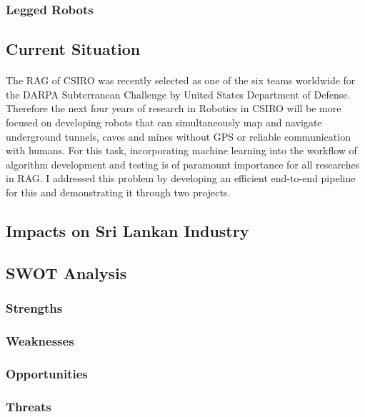 \subsubsection*{Legged Robots}
\subsubsection*{}

\subsection{Current Situation}

\paragraph{}
The RAG of CSIRO was recently selected as one of the six teams worldwide for the DARPA Subterranean Challenge by United States Department of Defense. Therefore the next four years of research in Robotics in CSIRO will be more focused on developing robots that can simultaneously map and navigate underground tunnels, caves and mines without GPS or reliable communication with humans. For this task, incorporating machine learning into the workflow of algorithm development and testing is of paramount importance for all researches in RAG. I addressed this problem by developing an efficient end-to-end pipeline for this and demonstrating it through two projects.

\subsection{Impacts on Sri Lankan Industry}

\subsection{SWOT Analysis}
\subsubsection{Strengths}
\subsubsection{Weaknesses}
\subsubsection{Opportunities}
\subsubsection{Threats}

